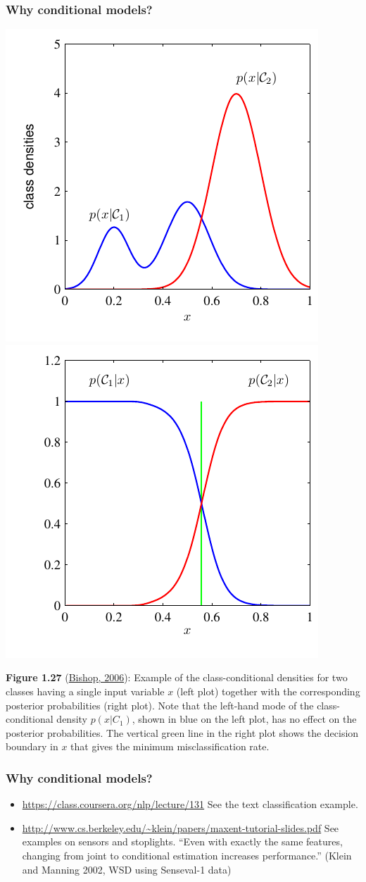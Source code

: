 \documentclass[ignorenonframetext,plain]{beamer}
\begin{document}
\begin{frame}\frametitle{Why conditional models?}
\begin{center}
\includegraphics[width=.5\textwidth]{images/bishop-fig-1-27a.pdf}
\includegraphics[width=.5\textwidth]{images/bishop-fig-1-27b.pdf}
\end{center}
\scriptsize {\bf Figure 1.27}
(\href{http://research.microsoft.com/en-us/um/people/cmbishop/prml}
{Bishop, 2006}): Example of the class-conditional densities for two
classes having a single input variable $x$ (left plot) together with
the corresponding posterior probabilities (right plot). Note that the
left-hand mode of the class-conditional density $p(x|C_1)$, shown in
blue on the left plot, has no effect on the posterior
probabilities. The vertical green line in the right plot shows the
decision boundary in $x$ that gives the minimum misclassiﬁcation rate.
\end{frame}

\begin{frame}\frametitle{Why conditional models?}
\begin{itemize}
\item \url{https://class.coursera.org/nlp/lecture/131}  See the text
  classification example.
\item
  \url{http://www.cs.berkeley.edu/~klein/papers/maxent-tutorial-slides.pdf}
  See examples on sensors and stoplights.  ``Even with exactly the
  same features, changing from joint to conditional estimation
  increases performance.''  (Klein and Manning 2002, WSD using
  Senseval-1 data)
\end{itemize}
\end{frame}
\end{document}
